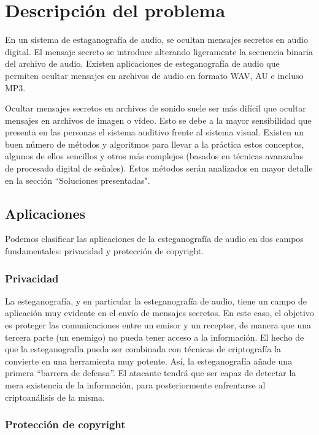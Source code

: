 \documentclass[12pt]{article}
\begin{document}
\newpage
\section{Descripción del problema}

En un sistema de estaganografía de audio, se ocultan mensajes secretos en audio digital. El mensaje secreto se introduce alterando ligeramente la secuencia binaria del archivo de audio. Existen aplicaciones de esteganografía de audio que permiten ocultar mensajes en archivos de audio en formato WAV, AU e incluso MP3.

Ocultar mensajes secretos en archivos de sonido suele ser más difícil que ocultar mensajes en archivos de imagen o vídeo. Esto se debe a la mayor sensibilidad que presenta en las personas el sistema auditivo frente al sistema visual. Existen un buen número de métodos y algoritmos para llevar a la práctica estos conceptos, algunos de ellos sencillos y otros más complejos (basados en técnicas avanzadas de procesado digital de señales). Estos métodos serán analizados en mayor detalle en la sección ``Soluciones presentadas".

\subsection{Aplicaciones}

Podemos clasificar las aplicaciones de la esteganografía de audio en dos campos fundamentales: privacidad y protección de copyright.

\subsubsection{Privacidad}

La esteganografía, y en particular la esteganografía de audio, tiene un campo de aplicación muy evidente en el envío de mensajes secretos. En este caso, el objetivo es proteger las comunicaciones entre un emisor y un receptor, de manera que una tercera parte (un enemigo) no pueda tener acceso a la información. El hecho de que la esteganografía pueda ser combinada con técnicas de criptografía la convierte en una herramienta muy potente. Así, la esteganografía añade una primera ``barrera de defensa''. El atacante tendrá que ser capaz de detectar la mera existencia de la información, para posteriormente enfrentarse al criptoanálisis de la misma.

\subsubsection{Protección de copyright}
\end{document}
